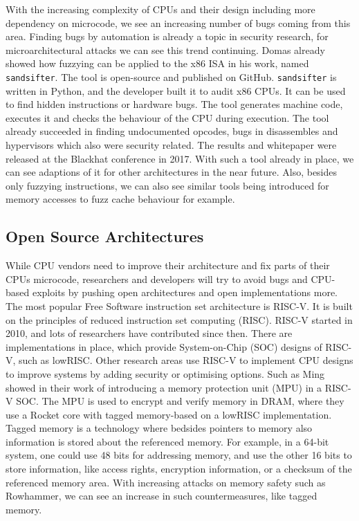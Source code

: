With the increasing complexity of CPUs and their design including more
dependency on microcode, we see an increasing number of bugs coming from this
area. Finding bugs by automation is already a topic in security research, for
microarchitectural attacks we can see this trend continuing.
Domas\cite{sandsifter} already showed how fuzzying can be applied to the x86
ISA in his work, named \texttt{sandsifter}. The tool is open-source and
published on GitHub\cite{sandsifterurl}. \texttt{sandsifter} is written in
Python, and the developer built it to audit x86 CPUs. It can be used to find
hidden instructions or hardware bugs. The tool generates machine code, executes
it and checks the behaviour of the CPU during execution. The tool already
succeeded in finding undocumented opcodes, bugs in disassembles and hypervisors
which also were security related. The results and whitepaper were released at
the Blackhat conference in 2017\cite{sandsifter}. With such a tool already in
place, we can see adaptions of it for other architectures in the near future.
Also, besides only fuzzying instructions, we can also see similar tools being
introduced for memory accesses to fuzz cache behaviour for example.

\subsection{Open Source Architectures}

While CPU vendors need to improve their architecture and fix parts of their
CPU\textquotesingle s microcode, researchers and developers will try to avoid
bugs and CPU-based exploits by pushing open architectures and open
implementations more. The most popular Free Software instruction set
architecture is RISC-V. It is built on the principles of reduced instruction
set computing (RISC). RISC-V started in 2010, and lots of researchers have
contributed since then. There are implementations in place, which provide
System-on-Chip (SOC) designs of RISC-V, such as lowRISC\cite{lowrisc}. Other
research areas use RISC-V to implement CPU designs to improve systems by
adding security or optimising options. Such as Ming~\etal\cite{smarts} showed
in their work of introducing a memory protection unit (MPU) in a RISC-V SOC.
The MPU is used to encrypt and verify memory in DRAM, where they use a Rocket
core with tagged memory-based on a lowRISC implementation. Tagged memory is a
technology where bedsides pointers to memory also information is stored about
the referenced memory. For example, in a 64-bit system, one could use 48 bits
for addressing memory, and use the other 16 bits to store information, like
access rights, encryption information, or a checksum of the referenced memory
area. With increasing attacks on memory safety such as Rowhammer, we can see an
increase in such countermeasures, like tagged memory.

